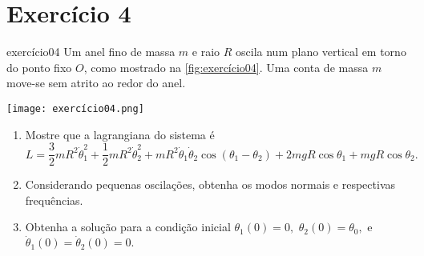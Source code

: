 \section*{Exercício 4}
\begin{exercício}{}{exercício04}
    Um anel fino de massa \(m\) e raio \(R\) oscila num plano vertical em torno do ponto fixo \(O\), como mostrado na \cref{fig:exercício04}. Uma conta de massa \(m\) move-se sem atrito ao redor do anel.
    \begin{center}
        \texttt{[image: exercício04.png]}
        \label{fig:exercício04}
    \end{center}
    \begin{enumerate}[label=(\alph*)]
        \item Mostre que a lagrangiana do sistema é
            \begin{equation*}
                L = \frac32 mR^2\dot\theta_1^2 + \frac12 mR^2\dot\theta_2^2 + m R^2\dot\theta_1\dot\theta_2\cos{(\theta_1 - \theta_2)} + 2mgR \cos\theta_1 + mgR\cos\theta_2.
            \end{equation*}
        \item Considerando pequenas oscilações, obtenha os modos normais e respectivas frequências.
        \item Obtenha a solução para a condição inicial \(\theta_1(0) = 0,\) \(\theta_2(0) = \theta_0,\) e \(\dot\theta_1(0) = \dot\theta_2(0) = 0.\)
    \end{enumerate}
\end{exercício}
